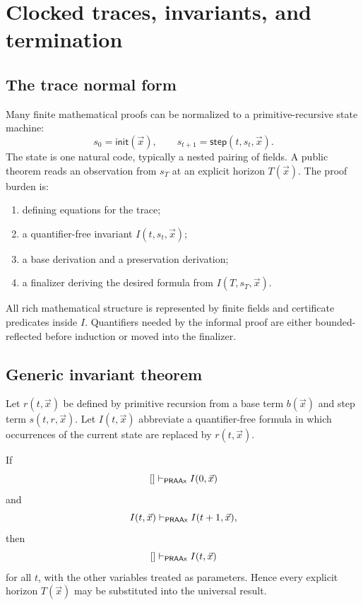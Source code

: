 \section{Clocked traces, invariants, and termination}\label{sec:traces}

\subsection{The trace normal form}

Many finite mathematical proofs can be normalized to a primitive-recursive state machine:
\[
 s_0=\mathsf{init}(\vec x),\qquad
 s_{t+1}=\mathsf{step}(t,s_t,\vec x).
\]
The state is one natural code, typically a nested pairing of fields.  A public theorem reads an
observation from \(s_T\) at an explicit horizon \(T(\vec x)\).  The proof burden is:

\begin{enumerate}
\item defining equations for the trace;
\item a quantifier-free invariant \(I(t,s_t,\vec x)\);
\item a base derivation and a preservation derivation;
\item a finalizer deriving the desired formula from \(I(T,s_T,\vec x)\).
\end{enumerate}

All rich mathematical structure is represented by finite fields and certificate predicates inside
\(I\).  Quantifiers needed by the informal proof are either bounded-reflected before induction or
moved into the finalizer.

\subsection{Generic invariant theorem}

Let \(r(t,\vec x)\) be defined by primitive recursion from a base term \(b(\vec x)\) and step term
\(s(t,r,\vec x)\).  Let \(I(t,\vec x)\) abbreviate a quantifier-free formula in which occurrences of
the current state are replaced by \(r(t,\vec x)\).

\begin{theorem}\label{thm:trace}
If
\[
 []\vdash_{\mathsf{PRAAx}} I(0,\vec x)
\]
and
\[
 I(t,\vec x)\vdash_{\mathsf{PRAAx}} I(t+1,\vec x),
\]
then
\[
 []\vdash_{\mathsf{PRAAx}} I(t,\vec x)
\]
for all \(t\), with the other variables treated as parameters.  Hence every explicit horizon
\(T(\vec x)\) may be substituted into the universal result.
\end{theorem}

